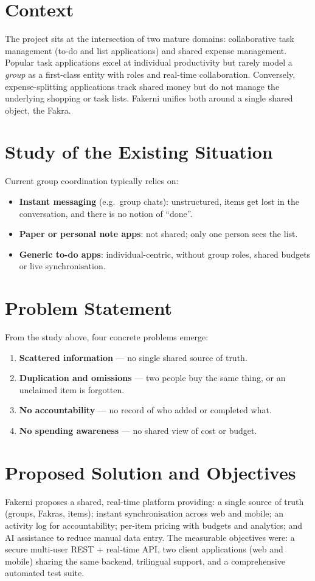 \documentclass[12pt,a4paper,oneside]{report}
\begin{document}
\section{Context}
The project sits at the intersection of two mature domains: collaborative task
management (to-do and list applications) and shared expense management. Popular
task applications excel at individual productivity but rarely model a
\emph{group} as a first-class entity with roles and real-time collaboration.
Conversely, expense-splitting applications track shared money but do not manage
the underlying shopping or task lists. Fakerni unifies both around a single
shared object, the Fakra.

\section{Study of the Existing Situation}
Current group coordination typically relies on:
\begin{itemize}[leftmargin=1.4em]
  \item \textbf{Instant messaging} (e.g.\ group chats): unstructured, items get
        lost in the conversation, and there is no notion of ``done''.
  \item \textbf{Paper or personal note apps}: not shared; only one person sees
        the list.
  \item \textbf{Generic to-do apps}: individual-centric, without group roles,
        shared budgets or live synchronisation.
\end{itemize}

\section{Problem Statement}
From the study above, four concrete problems emerge:
\begin{enumerate}[leftmargin=1.6em]
  \item \textbf{Scattered information} --- no single shared source of truth.
  \item \textbf{Duplication and omissions} --- two people buy the same thing,
        or an unclaimed item is forgotten.
  \item \textbf{No accountability} --- no record of who added or completed what.
  \item \textbf{No spending awareness} --- no shared view of cost or budget.
\end{enumerate}

\section{Proposed Solution and Objectives}
Fakerni proposes a shared, real-time platform providing: a single source of
truth (groups, Fakras, items); instant synchronisation across web and mobile;
an activity log for accountability; per-item pricing with budgets and analytics;
and AI assistance to reduce manual data entry. The measurable objectives were:
a secure multi-user REST + real-time API, two client applications (web and
mobile) sharing the same backend, trilingual support, and a comprehensive
automated test suite.
\end{document}
